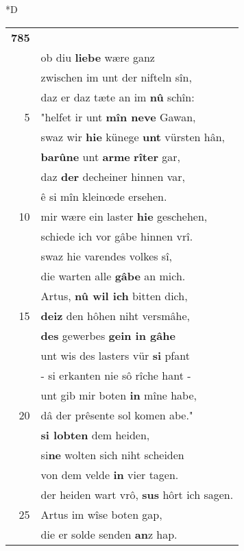 \documentclass[8pt,a4paper,notitlepage]{article}
\begin{document}
\begin{table}[ht]
\begin{minipage}[t]{0.5\linewidth}
\small
\begin{center}*D
\end{center}
\begin{tabular}{rl}
\textbf{785} & \textit{\begin{large}E\end{large}}r vrâgete den künec Gramoflanz,\\ 
 & ob diu \textbf{liebe} wære ganz\\ 
 & zwischen im unt der nifteln sîn,\\ 
 & daz er daz tæte an im \textbf{nû} schîn:\\ 
5 & "helfet ir unt \textbf{mîn neve} Gawan,\\ 
 & swaz wir \textbf{hie} künege \textbf{unt} vürsten hân,\\ 
 & \textbf{barûne} unt \textbf{arme} \textbf{rîter} gar,\\ 
 & daz \textbf{der} decheiner hinnen var,\\ 
 & ê si mîn kleinœde ersehen.\\ 
10 & mir wære ein laster \textbf{hie} geschehen,\\ 
 & schiede ich vor gâbe hinnen vrî.\\ 
 & swaz hie varendes volkes sî,\\ 
 & die warten alle \textbf{gâbe} an mich.\\ 
 & Artus, \textbf{nû wil ich} bitten dich,\\ 
15 & \textbf{deiz} den hôhen niht versmâhe,\\ 
 & \textbf{des} gewerbes \textbf{gein in gâhe}\\ 
 & unt wis des lasters vür \textbf{si} pfant\\ 
 & - si erkanten nie sô rîche hant -\\ 
 & unt gib mir boten \textbf{in} mîne habe,\\ 
20 & dâ der prêsente sol komen abe."\\ 
 & \textbf{si lobten} dem heiden,\\ 
 & si\textbf{ne} wolten sich niht scheiden\\ 
 & von dem velde \textbf{in} vier tagen.\\ 
 & der heiden wart vrô, \textbf{sus} hôrt ich sagen.\\ 
25 & Artus im wîse boten gap,\\ 
 & die er solde senden \textbf{an}z hap.\\ 

\end{tabular}
\end{minipage}
\end{table}
\end{document}
